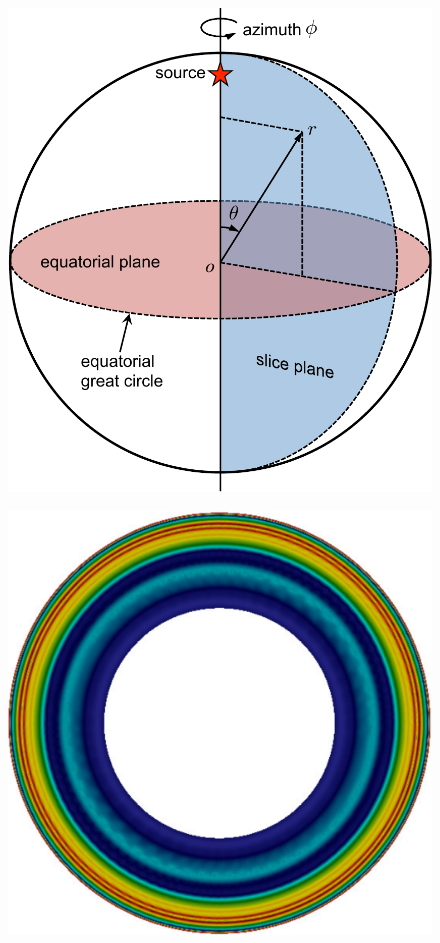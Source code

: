 \documentclass[extra,referee]{gji}
\begin{document}
\newpage
\FloatBarrier

\begin{figure}
  \centering
  \begin{minipage}{0.4\textwidth}
    \centering
    \includegraphics[width=1\textwidth]{fig/snapshot/sketch.pdf} 
    \label{fig:sk}
  \end{minipage}%
  \begin{minipage}{0.6\textwidth}
    \begin{minipage}{.585\textwidth}
      \centering
      \includegraphics[height=.9\textwidth]{fig/snapshot/1d-phi.pdf}

\end{minipage}
\end{minipage}
\end{figure}
\end{document}
